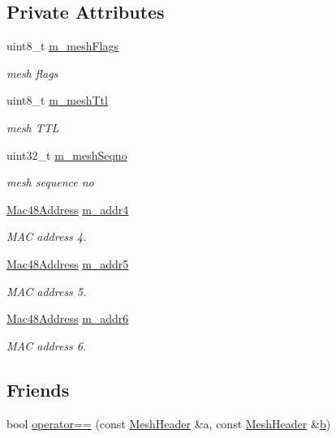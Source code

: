 \subsection*{Private Attributes}
\begin{DoxyCompactItemize}
\item 
uint8\+\_\+t \hyperlink{classns3_1_1dot11s_1_1MeshHeader_a6cb6a7dd16beef2e5cf113df85690cf0}{m\+\_\+mesh\+Flags}
\begin{DoxyCompactList}\small\item\em mesh flags \end{DoxyCompactList}\item 
uint8\+\_\+t \hyperlink{classns3_1_1dot11s_1_1MeshHeader_ad1e601e495f9e0893c5d2798752b159a}{m\+\_\+mesh\+Ttl}
\begin{DoxyCompactList}\small\item\em mesh T\+TL \end{DoxyCompactList}\item 
uint32\+\_\+t \hyperlink{classns3_1_1dot11s_1_1MeshHeader_af42c8d6c650c246d37c13985641b0776}{m\+\_\+mesh\+Seqno}
\begin{DoxyCompactList}\small\item\em mesh sequence no \end{DoxyCompactList}\item 
\hyperlink{classns3_1_1Mac48Address}{Mac48\+Address} \hyperlink{classns3_1_1dot11s_1_1MeshHeader_a4d62d6b97bff6136314833200b747e17}{m\+\_\+addr4}
\begin{DoxyCompactList}\small\item\em M\+AC address 4. \end{DoxyCompactList}\item 
\hyperlink{classns3_1_1Mac48Address}{Mac48\+Address} \hyperlink{classns3_1_1dot11s_1_1MeshHeader_aec4f70b8a26d0134c5b1239a88d0f542}{m\+\_\+addr5}
\begin{DoxyCompactList}\small\item\em M\+AC address 5. \end{DoxyCompactList}\item 
\hyperlink{classns3_1_1Mac48Address}{Mac48\+Address} \hyperlink{classns3_1_1dot11s_1_1MeshHeader_a339b9fe0435cd04b204400e933d56fcc}{m\+\_\+addr6}
\begin{DoxyCompactList}\small\item\em M\+AC address 6. \end{DoxyCompactList}\end{DoxyCompactItemize}
\subsection*{Friends}
\begin{DoxyCompactItemize}
\item 
bool \hyperlink{classns3_1_1dot11s_1_1MeshHeader_a9f412c66ec5646a720bdabb50a70014b}{operator==} (const \hyperlink{classns3_1_1dot11s_1_1MeshHeader}{Mesh\+Header} \&a, const \hyperlink{classns3_1_1dot11s_1_1MeshHeader}{Mesh\+Header} \&\hyperlink{lte__pathloss_8m_a21ad0bd836b90d08f4cf640b4c298e7c}{b})
\end{DoxyCompactItemize}
